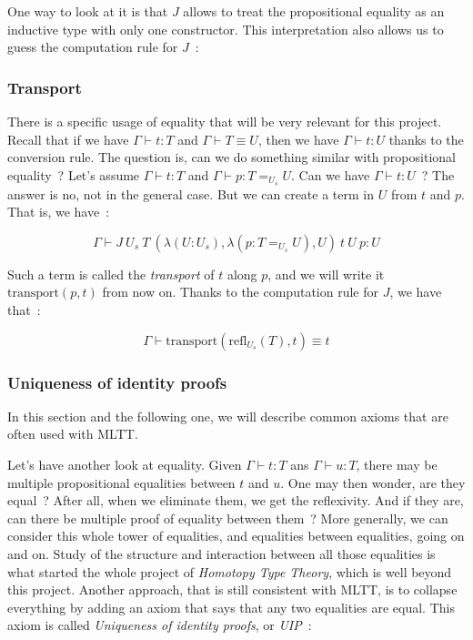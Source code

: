One way to look at it is that $J$ allows to treat the propositional equality as
an inductive type with only one constructor. This interpretation also allows us
to guess the computation rule for $J$~:

\begin{center}\begin{prooftree}
\end{prooftree}\end{center}

\subsubsection{Transport}\label{transport}

There is a specific usage of equality that will be very relevant for this
project. Recall that if we have $\Gamma\vdash t : T$ and $\Gamma\vdash T \equiv U$, then we have
$\Gamma\vdash t : U$ thanks to the conversion rule.  The question is, can we do something
similar with propositional equality~? Let's assume $\Gamma\vdash t : T$ and
$\Gamma\vdash p : T =_{U_{s}} U$. Can we have $\Gamma\vdash t : U$~? The answer is no, not in the
general case.  But we can create a term in $U$ from $t$ and $p$. That is, we
have~:

\[\Gamma\vdash J\ U_{s}\ T\ (\lambda(U : U_{s}), \lambda(p : T =_{U_{s}} U), U)\ t\ U\ p : U\]

Such a term is called the \emph{transport} of $t$ along $p$, and we will write
it $\text{transport}(p,t)$ from now on. Thanks to the computation rule for $J$,
we have that~:

\[\Gamma\vdash\text{transport}(\text{refl}_{U_{s}}(T),t) \equiv t\]

\subsubsection{Uniqueness of identity proofs}\label{uip}

In this section and the following one, we will describe common axioms that are
often used with MLTT.

Let's have another look at equality. Given $\Gamma\vdash t : T$ ans $\Gamma\vdash u : T$, there may
be multiple propositional equalities between $t$ and $u$. One may then wonder,
are they equal~? After all, when we eliminate them, we get the reflexivity. And
if they are, can there be multiple proof of equality between them~? More
generally, we can consider this whole tower of equalities, and equalities
between equalities, going on and on. Study of the structure and interaction
between all those equalities is what started the whole project of \emph{Homotopy
Type Theory}, which is well beyond this project. Another approach, that is still
consistent with MLTT, is to collapse everything by adding an axiom that says
that any two equalities are equal. This axiom is called \emph{Uniqueness of
identity proofs}, or \emph{UIP}~:

